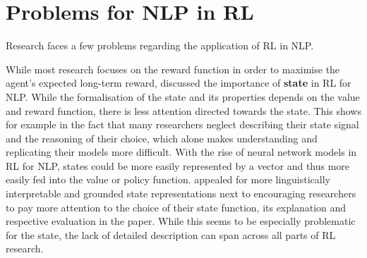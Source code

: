 \documentclass[11pt,a4paper]{article}
\begin{document}
\section{Problems for NLP in RL}
Research faces a few problems regarding the application of RL in NLP. 

While most research focuses on the reward function in order to maximise the agent's expected long-term reward, \citet{madureira2020} discussed the importance of \textbf{state} in RL for NLP. While the formalisation of the state and its properties depends on the value and reward function, there is less attention directed towards the state. This shows for example in the fact that many researchers neglect describing their state signal and the reasoning of their choice, which alone makes understanding and replicating their models more difficult. With the rise of neural network models in RL for NLP, states could be more easily represented by a vector and thus more easily fed into the value or policy function. \citet{madureira2020} appealed for more linguistically interpretable and grounded state representations next to encouraging researchers to pay more attention to the choice of their state function, its explanation and respective evaluation in the paper. While this seems to be especially problematic for the state, the lack of detailed description can span across all parts of RL research.
\end{document}
